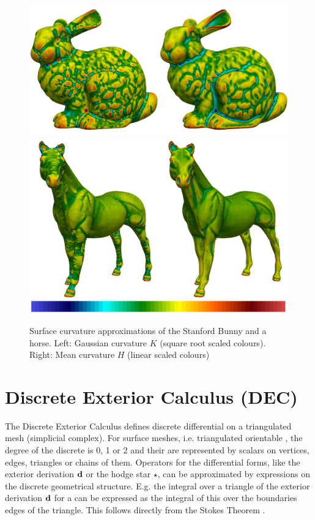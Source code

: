   
  \begin{figure}
    \centering\includegraphics[width=.45\textwidth]{bilder/bunnyCurvature.jpg}
    \centering\includegraphics[width=.45\textwidth]{bilder/horseCurvature.jpg}
    \centering\includegraphics[width=.45\textwidth]{bilder/colourBar.jpg}
    \caption{Surface curvature approximations of the Stanford Bunny and a horse.
             Left: Gaussian curvature \( K \) (square root scaled colours).
             Right: Mean curvature \( H \) (linear scaled colours)}
    \label{figBunnyHorseCurvature}
  \end{figure}


\section{Discrete Exterior Calculus (DEC)}
  The Discrete Exterior Calculus \citep{hirani, desbrun} defines discrete differential  on a triangulated mesh (simplicial complex).
  For surface meshes, i.e. triangulated orientable , the degree of the discrete  is 0, 1 or 2
  and their are represented by scalars on vertices, edges, triangles or chains of them. 
  Operators for the differential forms, like the exterior derivation \( \mathbf{d} \) or the hodge star \( \star \), can be approximated by expressions on the discrete
  geometrical structure. 
  E.g. the integral over a triangle of the exterior derivation \( \mathbf{d} \) for a  can be expressed as the integral of this
   over the boundaries edges of the triangle. 
  This follows directly from the Stokes Theorem \citep[Ch. 7]{marsden}. 
 
